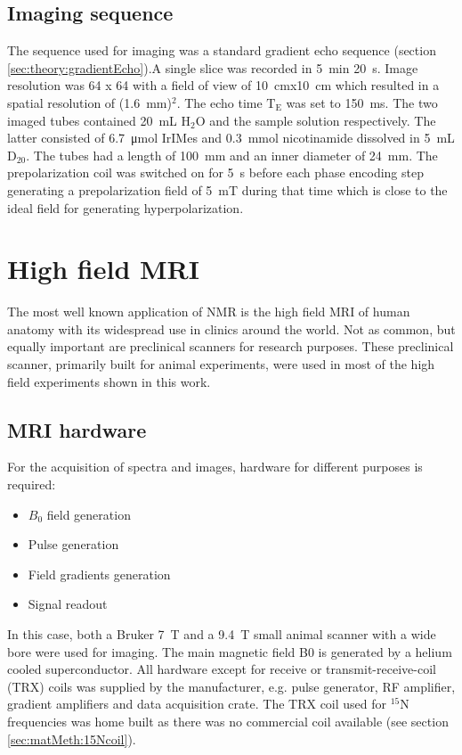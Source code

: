         \subsection{Imaging sequence}
        The sequence used for imaging was a standard gradient echo sequence (section \ref{sec:theory:gradientEcho}).A single slice was recorded in \SI{5}{\minute} \SI{20}{\second}. Image resolution was 64 x 64 with a field of view of \SI{10}{\cm}x\SI{10}{\cm} which resulted in a spatial resolution of (\SI{1.6}{\mm})$^2$. The echo time $\mathrm{T_E}$ was set to \SI{150}{\milli\second}. The two imaged tubes contained \SI{20}{\milli\liter} H$_2$O and the sample solution respectively. The latter consisted of \SI{6.7}{\micro\mole} IrIMes and \SI{0.3}{\milli\mole} nicotinamide dissolved in \SI{5}{\milli\liter} $\mathrm{D_20}$. The tubes had a length of \SI{100}{\milli\meter} and an inner diameter of \SI{24}{\milli\meter}. The prepolarization coil was switched on for \SI{5}{\second} before each phase encoding step generating a prepolarization field of \SI{5}{\milli\tesla} during that time which is close to the ideal field for generating hyperpolarization.
    \section{High field MRI}
        The most well known application of NMR is the high field MRI of human anatomy with its widespread use in clinics around the world. Not as common, but equally important are preclinical scanners for research purposes. These preclinical scanner, primarily built for animal experiments, were used in most of the high field experiments shown in this work.  
        \subsection{MRI hardware}
            For the acquisition of spectra and images, hardware for different purposes is required:
            \begin{itemize}
            \item $B_0$ field generation
            \item Pulse generation
            \item Field gradients generation
            \item Signal readout
            \end{itemize}
            In this case, both a Bruker \SI{7}{\tesla} and a \SI{9.4}{\tesla} small animal scanner with a wide bore were used for imaging. The main magnetic field B0 is generated by a helium cooled superconductor. All hardware except for receive or transmit-receive-coil (TRX) coils was supplied by the manufacturer, e.g. pulse generator, RF amplifier, gradient amplifiers and data acquisition crate. The TRX coil used for $^{15}$N frequencies was home built as there was no commercial coil available (see section \ref{sec:matMeth:15Ncoil}).
